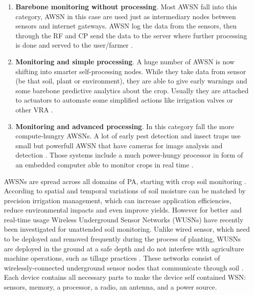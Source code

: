 \documentclass[review]{elsarticle}
\begin{document}
    \begin{enumerate}
        \item \textbf{Barebone monitoring without processing}. Most AWSN fall into this category, AWSN in this case are used just as intermediary nodes between sensors and internet gateways. AWSN log the data from the sensors, then through the RF and CP send the data to the server where further processing is done and served to the user/farmer \cite{Akyildiz_2004, Tzounis_2017, Dinh_Le_2015}.
        \item \textbf{Monitoring and simple processing}. A huge number of AWSN is now shifting into smarter self-processing nodes. While they take data from sensor (be that soil, plant or environment), they are able to give early warnings and some barebone predictive analytics about the crop. Usually they are attached to actuators to automate some simplified actions like irrigation valves or other VRA \cite{Hu_2010,Akyildiz_2004,Mainwaring200288}.
        \item \textbf{Monitoring and advanced processing}. In this category fall the more compute-hungry AWSNs. A lot of early pest detection and insect traps use small but powerfull AWSN that have cameras for image analysis and detection \cite{Chougule_2016}. Those systems include a much power-hungy processor in form of an embedded computer able to monitor crops in real time \cite{Liqiang_2011, Jzau_Sheng_Lin_2008, Lv_2009, Chougule_2016}.
    \end{enumerate}

    AWSNs are spread across all domains of PA, starting with crop soil monitoring \cite{Wang_2013, Chen_2012,Sun_2009}. According to \cite{Yunseop_Kim_2008} spatial and temporal variations of soil moisture can be matched by precision irrigation management, which can increase application efficiencies, reduce environmental impacts and even improve yields. However for better and real-time usage Wireless Underground Sensor Networks (WUSNs) have recently been investigated for unattended soil monitoring. Unlike wired sensor, which need to be deployed and removed frequently during the process of planting, WUSNs are deployed in the ground at a safe depth and do not interfere with agriculture machine operations, such as tillage practices \cite{Akyildiz_2006}. These networks consist of wirelessly-connected underground sensor nodes that communicate through soil \cite{Dong_2013}. Each device contains all necessary parts to make the device self contained WSN: sensors, memory, a processor, a radio, an antenna, and a power source.
\end{document}
